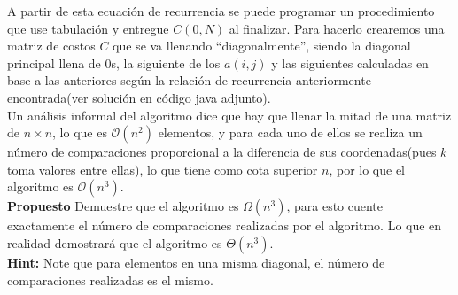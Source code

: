 \documentclass[dcc]{fcfmcourse}
\begin{document}
\begin{itemize}
A partir de esta ecuación de recurrencia se puede programar un procedimiento que use tabulación y entregue $C(0,N)$ al finalizar. Para hacerlo crearemos una matriz de costos $C$ que se va llenando ``diagonalmente'', siendo la diagonal principal llena de $0$s, la siguiente de los $a(i,j)$ y las siguientes calculadas en base a las anteriores según la relación de recurrencia anteriormente encontrada(ver solución en código java adjunto).\\

Un análisis informal del algoritmo dice que hay que llenar la mitad de una matriz de $n\times n$, lo que es $\mathcal{O}(n^2)$ elementos, y para cada uno de ellos se realiza un número de comparaciones proporcional a la diferencia de sus coordenadas(pues $k$ toma valores entre ellas), lo que tiene como cota superior $n$, por lo que el algoritmo es $\mathcal{O}(n^3)$.\\

\textbf{Propuesto} Demuestre que el algoritmo es $\Omega (n^3)$, para esto cuente exactamente el número de comparaciones realizadas por el algoritmo. Lo que en realidad demostrará que el algoritmo es $\Theta (n^3)$.\\ \textbf{Hint:} Note que para elementos en una misma diagonal, el número de comparaciones realizadas es el mismo.

\end{itemize}
\end{document}
